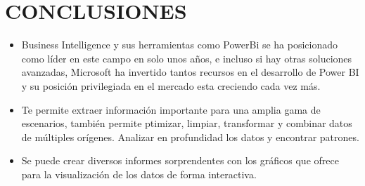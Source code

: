 \section{CONCLUSIONES}
\begin{itemize}
\item Business Intelligence y sus herramientas como PowerBi se ha posicionado como líder en este campo en solo unos años, e incluso si hay otras soluciones avanzadas, Microsoft ha invertido tantos recursos en el desarrollo de Power BI y su posición privilegiada en el mercado esta creciendo cada vez más.
\item Te permite extraer información importante para una amplia gama de escenarios, también permite ptimizar, limpiar, transformar y combinar datos de múltiples orígenes. Analizar en profundidad los datos y encontrar patrones.
\item Se puede crear diversos informes sorprendentes con los gráficos que ofrece para la visualización de los datos de forma interactiva.
\end{itemize}

\newpage
